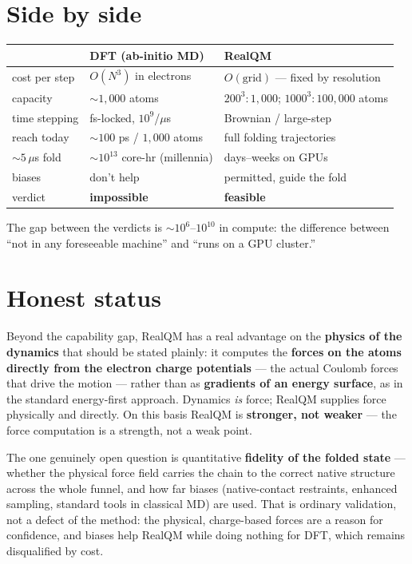 \documentclass[11pt]{article}
\begin{document}
\section{Side by side}
\begin{center}
\begin{tabular}{lll}
\toprule
 & \textbf{DFT (ab-initio MD)} & \textbf{RealQM} \\
\midrule
cost per step   & $O(N^3)$ in electrons        & $O(\text{grid})$ --- fixed by resolution \\
capacity        & ${\sim}1{,}000$ atoms        & $200^3\!:1{,}000$; $1000^3\!:100{,}000$ atoms \\
time stepping   & fs-locked, $10^9$/$\mu$s     & Brownian / large-step \\
reach today     & ${\sim}100$ ps / $1{,}000$ atoms & full folding trajectories \\
${\sim}5\,\mu$s fold & ${\sim}10^{13}$ core-hr (millennia) & days--weeks on GPUs \\
biases          & don't help                  & permitted, guide the fold \\
verdict         & \textbf{impossible}         & \textbf{feasible} \\
\bottomrule
\end{tabular}
\end{center}
The gap between the verdicts is ${\sim}10^{6}$--$10^{10}$ in compute: the difference between ``not in any
foreseeable machine'' and ``runs on a GPU cluster.''

\section{Honest status}
Beyond the capability gap, RealQM has a real advantage on the \textbf{physics of the dynamics} that should be
stated plainly: it computes the \textbf{forces on the atoms directly from the electron charge potentials} ---
the actual Coulomb forces that drive the motion --- rather than as \textbf{gradients of an energy surface}, as
in the standard energy-first approach. Dynamics \emph{is} force; RealQM supplies force physically and directly.
On this basis RealQM is \textbf{stronger, not weaker} --- the force computation is a strength, not a weak point.

The one genuinely open question is quantitative \textbf{fidelity of the folded state} --- whether the physical
force field carries the chain to the correct native structure across the whole funnel, and how far biases
(native-contact restraints, enhanced sampling, standard tools in classical MD) are used. That is ordinary
validation, not a defect of the method: the physical, charge-based forces are a reason for confidence, and
biases help RealQM while doing nothing for DFT, which remains disqualified by cost.
\end{document}
